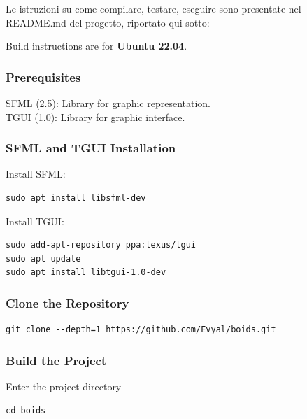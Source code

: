\documentclass[10pt,a4paper]{article}
\begin{document}
Le istruzioni su come compilare, testare, eseguire sono presentate nel README.md del progetto, riportato qui sotto:

Build instructions are for \textbf{Ubuntu 22.04}.

\subsubsection{Prerequisites}

\href{https://github.com/SFML/SFML}{SFML} (2.5): Library for graphic representation. \\
\href{https://github.com/texus/TGUI}{TGUI} (1.0): Library for graphic interface.

\subsubsection{SFML and TGUI Installation}

Install SFML:

\begin{lstlisting}[style=github-bash]
sudo apt install libsfml-dev
\end{lstlisting}

Install TGUI:

\begin{lstlisting}[style=github-bash]
sudo add-apt-repository ppa:texus/tgui
sudo apt update
sudo apt install libtgui-1.0-dev
\end{lstlisting}

\subsubsection{Clone the Repository}

\begin{lstlisting}[style=github-bash]
git clone --depth=1 https://github.com/Evyal/boids.git
\end{lstlisting}

\subsubsection{Build the Project}

Enter the project directory

\begin{lstlisting}[style=github-bash]
cd boids
\end{lstlisting}
\end{document}
